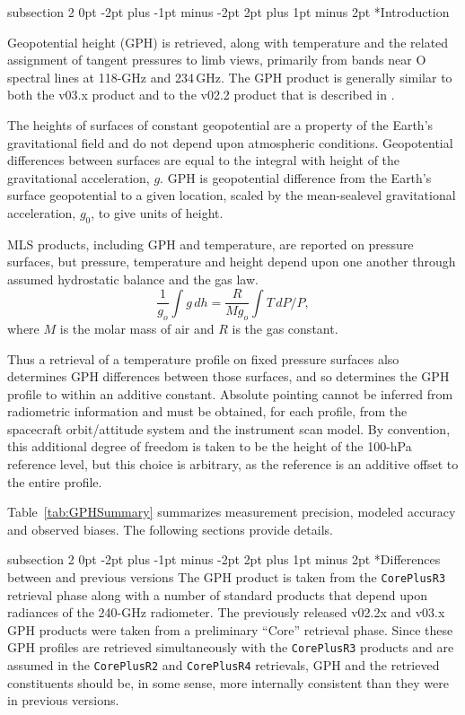 \documentclass[11pt,draft]{report}
\makeatletter
\renewcommand{\subsection}{\@startsection%
  {subsection}%
  {2}%
  {0pt}%
  {-2pt plus -1pt minus -2pt}%
  {2pt plus 1pt minus 2pt}%
  {\large\sffamily\fontseries{sb}\selectfont\flushleft\color{SectionColor}\figureversion{tabular}}}%
\makeatother
\begin{document}
\subsection*{Introduction}

Geopotential height (GPH) is retrieved, along with temperature and the
related assignment of tangent pressures to limb views, primarily from
bands near O spectral lines at 118-GHz and 234\,GHz.  The \thisv GPH
product is generally similar to both the v03.x product and to the v02.2
product that is described in \citet{SchwartzEtal08}.

The heights of surfaces of constant geopotential are a property of the
Earth's gravitational field and do not depend upon atmospheric
conditions.  Geopotential differences between surfaces are equal to the
integral with height of the gravitational acceleration, $g$.  GPH is
geopotential difference from the Earth's surface geopotential to a given
location, scaled by the mean-sealevel gravitational acceleration, $g_0$,
to give units of height.

MLS products, including GPH and temperature, are reported on pressure
surfaces, but pressure, temperature and height depend upon one another
through assumed hydrostatic balance and the gas law.
\begin{equation}
\frac{1}{g_o} \int g\,dh = \frac{R}{M g_o}\int T\,dP/P,
\end{equation}
where $M$ is the molar mass of air and $R$ is the gas constant.

Thus a retrieval of a temperature profile on fixed pressure surfaces
also determines GPH differences between those surfaces, and so
determines the GPH profile to within an additive constant.  Absolute
pointing cannot be inferred from radiometric information and must be
obtained, for each profile, from the spacecraft orbit/attitude system
and the instrument scan model.  By convention, this additional degree of
freedom is taken to be the height of the 100-hPa reference level, but
this choice is arbitrary, as the reference is an additive offset to the
entire profile.

Table~\ref{tab:GPHSummary} summarizes \thisv measurement precision,
modeled accuracy and observed biases.  The following sections provide
details.

\subsection*{Differences between \thisv and previous versions}
The \thisv GPH product is taken from the \texttt{CorePlusR3} retrieval
phase along with a number of standard products that depend upon
radiances of the 240-GHz radiometer.  The previously released v02.2x and
v03.x GPH products were taken from a preliminary ``Core'' retrieval
phase.  Since these GPH profiles are retrieved simultaneously with the
\texttt{CorePlusR3} products and are assumed in the \texttt{CorePlusR2}
and \texttt{CorePlusR4} retrievals, GPH and the retrieved constituents
should be, in some sense, more internally consistent than they were in
previous versions.
\end{document}
